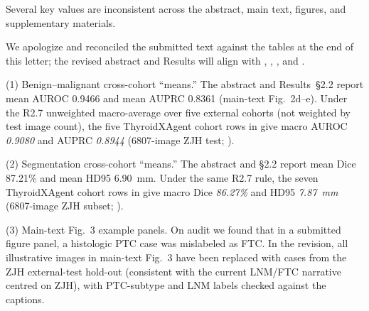\begin{reviewercomment}
Several key values are inconsistent across the abstract, main text, figures, and supplementary materials.
\end{reviewercomment}
\begin{authorresponse}
We apologize and reconciled the submitted text against the tables at the end of this letter; the revised abstract and Results will align with , , , and .\par
(1) Benign--malignant cross-cohort ``means.'' The abstract and Results~§2.2 report mean AUROC 0.9466 and mean AUPRC 0.8361 (main-text Fig.~2d--e). Under the R2.7 unweighted macro-average over five external cohorts (not weighted by test image count), the five ThyroidXAgent cohort rows in  give macro AUROC \emph{0.9080} and AUPRC \emph{0.8944} (6807-image ZJH test; ).\par
(2) Segmentation cross-cohort ``means.'' The abstract and §2.2 report mean Dice 87.21\% and mean HD95 6.90~mm. Under the same R2.7 rule, the seven ThyroidXAgent cohort rows in  give macro Dice \emph{86.27\%} and HD95 \emph{7.87~mm} (6807-image ZJH subset; ).\par
(3) Main-text Fig.~3 example panels. On audit we found that in a submitted figure panel, a histologic PTC case was mislabeled as FTC. In the revision, all illustrative images in main-text Fig.~3 have been replaced with cases from the ZJH external-test hold-out (consistent with the current LNM/FTC narrative centred on ZJH), with PTC-subtype and LNM labels checked against the captions.\par
\par
\end{authorresponse}

